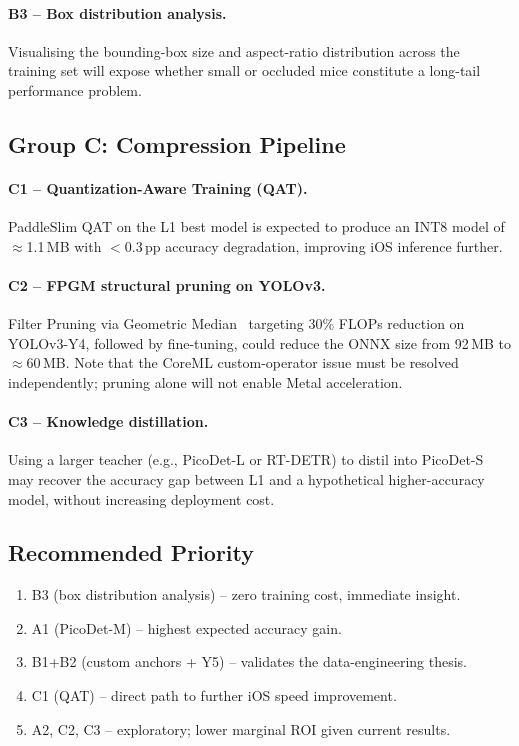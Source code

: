 \paragraph{B3 -- Box distribution analysis.}
Visualising the bounding-box size and aspect-ratio distribution across
the training set will expose whether small or occluded mice constitute
a long-tail performance problem.

\subsection{Group C: Compression Pipeline}

\paragraph{C1 -- Quantization-Aware Training (QAT).}
PaddleSlim QAT on the L1 best model is expected to produce an INT8
model of $\approx$1.1\,MB with $<$0.3\,pp accuracy degradation,
improving iOS inference further.

\paragraph{C2 -- FPGM structural pruning on YOLOv3.}
Filter Pruning via Geometric Median~\citep{he2019filter} targeting 30\%
FLOPs reduction on YOLOv3-Y4, followed by fine-tuning,
could reduce the ONNX size from 92\,MB to $\approx$60\,MB.
Note that the CoreML custom-operator issue must be resolved
independently; pruning alone will not enable Metal acceleration.

\paragraph{C3 -- Knowledge distillation.}
Using a larger teacher (e.g., PicoDet-L or RT-DETR) to distil
into PicoDet-S may recover the accuracy gap between L1 and a
hypothetical higher-accuracy model, without increasing deployment cost.

\subsection{Recommended Priority}

\begin{enumerate}[leftmargin=1.5em]
  \item B3 (box distribution analysis) -- zero training cost, immediate insight.
  \item A1 (PicoDet-M) -- highest expected accuracy gain.
  \item B1+B2 (custom anchors + Y5) -- validates the data-engineering thesis.
  \item C1 (QAT) -- direct path to further iOS speed improvement.
  \item A2, C2, C3 -- exploratory; lower marginal ROI given current results.
\end{enumerate}

